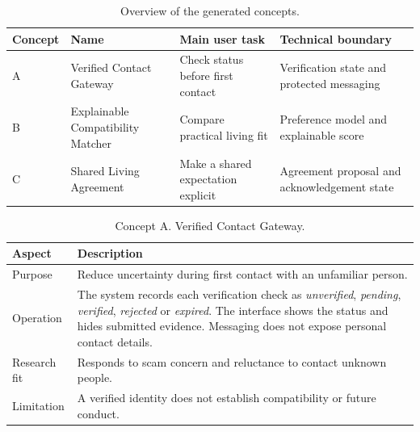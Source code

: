 \documentclass[11pt,a4paper]{article}
\begin{document}
\begin{table}[H]
    \centering
    \small
    \caption{Overview of the generated concepts.}
    \begin{tabularx}{\textwidth}{@{}L{1.4cm}L{4.1cm}Y Y@{}}
        \toprule
        Concept & Name & Main user task & Technical boundary\\
        \midrule
        A & Verified Contact Gateway & Check status before first contact & Verification state and protected messaging\\
        B & Explainable Compatibility Matcher & Compare practical living fit & Preference model and explainable score\\
        C & Shared Living Agreement & Make a shared expectation explicit & Agreement proposal and acknowledgement state\\
        \bottomrule
    \end{tabularx}
    \label{tabconceptoverview}
\end{table}

\begin{table}[H]
    \centering
    \small
    \caption{Concept A. Verified Contact Gateway.}
    \begin{tabularx}{\textwidth}{@{}L{3.2cm}Y@{}}
        \toprule
        Aspect & Description\\
        \midrule
        Purpose & Reduce uncertainty during first contact with an unfamiliar person.\\
        Operation & The system records each verification check as \textit{unverified}, \textit{pending}, \textit{verified}, \textit{rejected} or \textit{expired}. The interface shows the status and hides submitted evidence. Messaging does not expose personal contact details.\\
        Research fit & Responds to scam concern and reluctance to contact unknown people.\\
        Limitation & A verified identity does not establish compatibility or future conduct.\\
        \bottomrule
    \end{tabularx}
    \label{tabconcepta}
\end{table}
\end{document}

